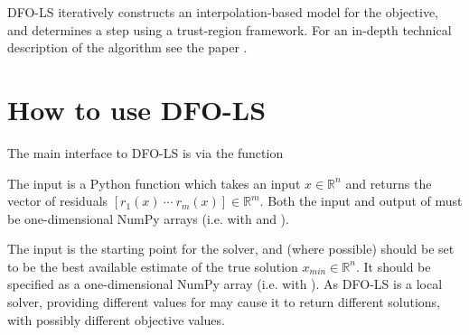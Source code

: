 \documentclass[letterpaper,10pt,english]{sphinxmanual}
\begin{document}
DFO-LS iteratively constructs an interpolation-based model for the objective, and determines a step using a trust-region framework.
For an in-depth technical description of the algorithm see the paper \label{\detokenize{userguide:id1}}{\hyperref[\detokenize{userguide:cfmr2018}]{\sphinxcrossref{{[}CFMR2018{]}}}}.


\section{How to use DFO-LS}
\label{\detokenize{userguide:how-to-use-dfo-ls}}
The main interface to DFO-LS is via the function 
\begin{quote}

\begin{sphinxVerbatim}[commandchars=\\\{\}]
   
\end{sphinxVerbatim}
\end{quote}

The input  is a Python function which takes an input \(x\in\mathbb{R}^n\) and returns the vector of residuals \([r_1(x)\: \cdots \: r_m(x)]\in\mathbb{R}^m\). Both the input and output of  must be one-dimensional NumPy arrays (i.e. with  and ).

The input  is the starting point for the solver, and (where possible) should be set to be the best available estimate of the true solution \(x_{min}\in\mathbb{R}^n\). It should be specified as a one-dimensional NumPy array (i.e. with ).
As DFO-LS is a local solver, providing different values for  may cause it to return different solutions, with possibly different objective values.
\end{document}
